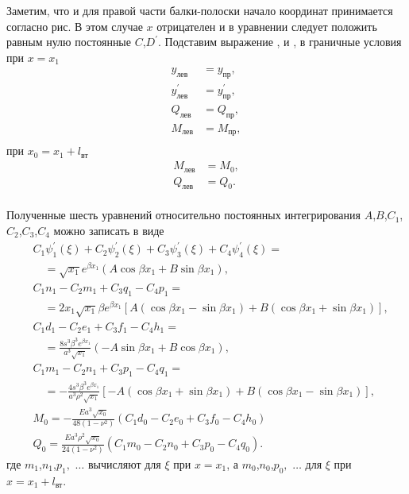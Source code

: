 Заметим, что и для правой части балки-полоски начало координат принимается согласно рис. В этом случае $x$ отрицателен и в уравнении следует положить равным нулю постоянные $C$,$D^{\prime}$.
Подставим выражение , и , в граничные условия при $x=x_1$
\begin{equation*}
  \label{Timoshenko_eq9}
  \begin{split}
    y_{\text{лев}}&=y_{\text{пр}},\\
    y_{\text{лев}}^{\prime}&=y_{\text{пр}}^{\prime},\\
    Q_{\text{лев}}&=Q_{\text{пр}},\\
    M_{\text{лев}}&=M_{\text{пр}},\\
  \end{split}  
\end{equation*}
при $x_0=x_1+l_{\text{вт}}$
\begin{equation*}
  \label{Timoshenko_eq10}
  \begin{split}
    M_{\text{лев}}&=M_0,\\
    Q_{\text{лев}}&=Q_0.\\
  \end{split}  
\end{equation*}

Полученные шесть уравнений относительно постоянных интегрирования $A$,$B$,$C_1$,$C_2$,$C_3$,$C_4$ можно записать в виде
\begin{equation}
  \label{Timoshenko_eq11}
  \begin{split}
    &C_1 \psi_1^{\prime}(\xi) +C_2 \psi_2^{\prime}(\xi)+C_3 \psi_3^{\prime}(\xi)+C_4 \psi_4^{\prime}(\xi)= \\
    & \quad =\sqrt{x_1} e^{\beta x_1} \left ( A \cos {\beta x_1}+B \sin{\beta x_1} \right ),\\
    &C_1 n_1-C_2 m_1+C_3 q_1-C_4 p_1= \\
    & \quad = 2x_1 \sqrt{x_1} \beta e^{\beta x_1} \left[ A \left ( \cos{\beta x_1} - \sin {\beta x_1} \right )+ B \left ( \cos{\beta x_1} + \sin {\beta x_1} \right ) \right],\\
    &C_1 d_1-C_2 e_1+C_3 f_1-C_4 h_1= \\
    & \quad = \frac{8 s^3 {\beta}^3 e^{\beta x_1}}{a^3 \sqrt{x_1}} \left ( -A \sin {\beta x_1}+B \cos{\beta x_1} \right ),\\
    &C_1 m_1-C_2 n_1+C_3 p_1-C_4 q_1= \\
    & \quad = -\frac{4 s^3 {\beta}^3 e^{\beta x_1}}{a^3 {\rho}^2 \sqrt{x_1}} \left[ - A \left ( \cos{\beta x_1} + \sin {\beta x_1} \right )+ B \left ( \cos{\beta x_1} - \sin {\beta x_1} \right ) \right],\\
    &M_0 =-\frac{Ea^3 \sqrt{x_0}}{48 \left( 1- {\nu}^2 \right)} \left ( C_1 d_0-C_2 e_0+C_3 f_0-C_4 h_0 \right )\\
    &Q_0 =\frac{Ea^3 {\rho}^2 \sqrt{x_0}}{24 \left( 1- {\nu}^2 \right)} \left ( C_1 m_0-C_2 n_0+C_3 p_0-C_4 q_0 \right ).
  \end{split}  
\end{equation}
где $m_1$,$n_1$,$p_1,$ $\ldots$ вычисляют для $\xi$ при $x=x_1$, а $m_0$,$n_0$,$p_0,$ $\ldots$ для $\xi$ при $x=x_1+l_{\text{вт}}$.

